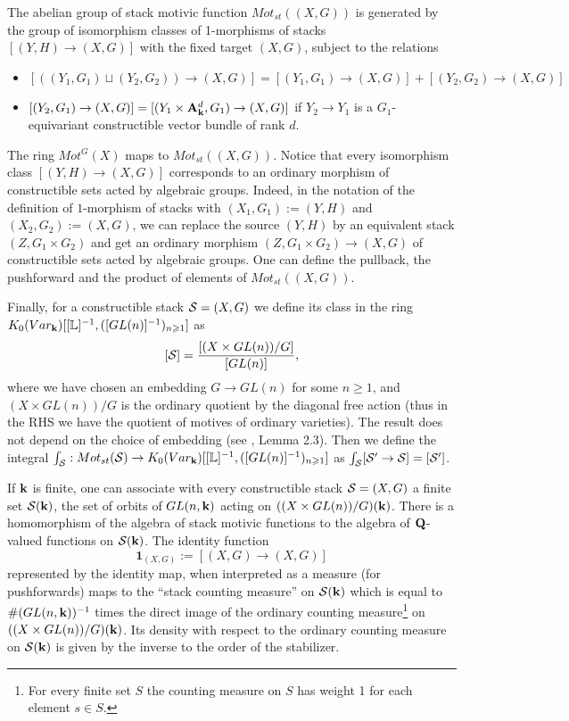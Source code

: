 \documentclass[12pt]{article}
\begin{document}
 The abelian group of stack motivic function $Mot_{st}((X,G))$ is generated by the group of isomorphism classes of 1-morphisms of stacks $[(Y,H)\to (X,G)]$ with the fixed target $(X,G)$, subject to the relations \begin{itemize}
\item
$[((Y_1,G_1)\sqcup (Y_2,G_2))\to (X,G)]=[(Y_1,G_1)\to (X,G)]+[(Y_2,G_2)\to (X,G)]$
\item $[(Y_2,G_1)\to (X,G)]=[(Y_1\times {\bf A}_{\bf k}^d,G_1)\to (X,G)]$ if $Y_2\to Y_1$ is a $G_1$-equivariant constructible vector 
bundle of rank $d$.
\end{itemize}
The ring $Mot^G(X)$ maps to $Mot_{st}((X,G))$. 
 Notice that every isomorphism class
$[(Y,H)\to (X,G)]$ corresponds to an ordinary morphism of constructible sets acted by algebraic groups. Indeed, in the notation of the definition of $1$-morphism of 
stacks with $(X_1,G_1):=(Y,H)$ and $(X_2,G_2):=(X,G)$, we can replace the source
  $(Y,H)$ by an equivalent stack $(Z,G_1\times G_2)$ and get an ordinary morphism
   $(Z,G_1\times G_2)\to (X,G)$ of constructible sets acted by algebraic groups.
    One can define the pullback, the pushforward and the product of elements of $Mot_{st}((X,G))$.


Finally, for a constructible stack ${\cal S}=(X,G)$ we define its class
 in the ring $ K_0(Var_{{\bf k}})[[{\mathbb L}]^{-1}, ([GL(n)]^{-1})_{n\geqslant 1}]$ as
$$[{\cal S}]={[(X\times GL(n))/G]\over {[GL(n)]}},$$
where we have chosen an embedding $G\to GL(n)$ for some $n\geqslant 1$, and $(X\times GL(n))/G$ is the ordinary quotient by the diagonal free action (thus in the RHS we have the quotient of motives of ordinary varieties). The result does not depend on the choice of embedding (see \cite{BDh}, Lemma 2.3). Then we define the integral
$\int_{\cal S}: Mot_{st}({\cal S})\to K_0(Var_{{\bf k}})[[{\mathbb L}]^{-1}, ([GL(n)]^{-1})_{n\geqslant 1}]$ as
$\int_{\cal S}[{\cal S}^{\prime}\to {\cal S}]=[{\cal S}^{\prime}]$.

If ${\bf k}$ is finite, one can associate with every constructible stack ${\cal S}=(X,G)$ a finite set ${\cal S}({\bf k})$, 
the set of orbits of $GL(n,{\bf k})$ acting on $((X\times GL(n))/G)({\bf k})$.  There is a homomorphism of the algebra of stack motivic functions 
 to the algebra of ${\bf Q}$-valued functions
 on ${\cal S}({\bf k})$. The identity function 
$$\mathbf{1}_{(X,G)}:=[(X,G)\to (X,G)]$$
represented by the identity map,  when interpreted as a measure (for pushforwards) maps to  
the ``stack counting measure''  on ${\cal S}({\bf k})$  which is equal to $\#(GL(n,{\bf k}))^{-1}$ 
times the 
 direct image of the ordinary counting measure\footnote{For every finite set $S$ the counting measure on $S$ has weight 1 for each element $s\in S$.} on $((X\times GL(n))/G)({\bf k})$.  Its density with respect to the ordinary counting measure on 
${\cal S}({\bf k})$ 
 is given by
the inverse 
to the order of the stabilizer. 
\end{document}

